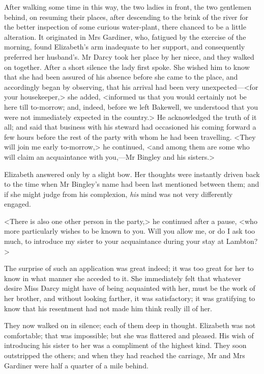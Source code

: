 After walking some time in this way, the two ladies in front, the two gentlemen behind, on resuming their places, after descending to the brink of the river for the better inspection of some curious water-plant, there chanced to be a little alteration. It originated in Mrs Gardiner, who, fatigued by the exercise of the morning, found Elizabeth's arm inadequate to her support, and consequently preferred her husband's. Mr Darcy took her place by her niece, and they walked on together. After a short silence the lady first spoke. She wished him to know that she had been assured of his absence before she came to the place, and accordingly began by observing, that his arrival had been very unexpected—<for your housekeeper,> she added, <informed us that you would certainly not be here till to-morrow; and, indeed, before we left Bakewell, we understood that you were not immediately expected in the country.> He acknowledged the truth of it all; and said that business with his steward had occasioned his coming forward a few hours before the rest of the party with whom he had been travelling. <They will join me early to-morrow,> he continued, <and among them are some who will claim an acquaintance with you,—Mr Bingley and his sisters.>

Elizabeth answered only by a slight bow. Her thoughts were instantly driven back to the time when Mr Bingley's name had been last mentioned between them; and if she might judge from his complexion, \textit{his} mind was not very differently engaged.

<There is also one other person in the party,> he continued after a pause, <who more particularly wishes to be known to you. Will you allow me, or do I ask too much, to introduce my sister to your acquaintance during your stay at Lambton?>

The surprise of such an application was great indeed; it was too great for her to know in what manner she acceded to it. She immediately felt that whatever desire Miss Darcy might have of being acquainted with her, must be the work of her brother, and without looking farther, it was satisfactory; it was gratifying to know that his resentment had not made him think really ill of her.

They now walked on in silence; each of them deep in thought. Elizabeth was not comfortable; that was impossible; but she was flattered and pleased. His wish of introducing his sister to her was a compliment of the highest kind. They soon outstripped the others; and when they had reached the carriage, Mr and Mrs Gardiner were half a quarter of a mile behind.

